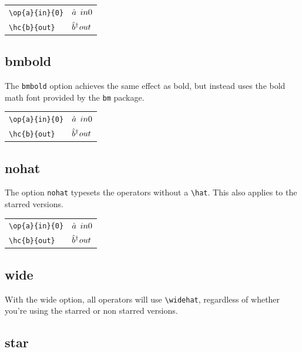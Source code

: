 \documentclass[10pt]{article}
\begin{document}
\renewcommand{\linopstyle}{\mathbf}
\renewcommand{\linopstylewide}{\linopstyle}

\begin{table}[H]
	\centering
	\begin{tabular}{ll}
		\verb|\op{a}{in}{0}| & $\op{a}{in}{0}$ \\
		\verb|\hc{b}{out}| & $\hc{b}{out}$
	\end{tabular}
\end{table}

\subsection{bmbold}
The \texttt{bmbold} option achieves the same effect as bold, but instead uses the bold math font provided by the \texttt{bm} package.

\renewcommand{\linopstyle}{\bm}

\begin{table}[H]
	\centering
	\begin{tabular}{ll}
		\verb|\op{a}{in}{0}| & $\op{a}{in}{0}$ \\
		\verb|\hc{b}{out}| & $\hc{b}{out}$
	\end{tabular}
\end{table}

\subsection{nohat}
The option \texttt{nohat} typesets the operators without a \verb|\hat|. This also applies to the starred versions.

\renewcommand{\linopstyle}{}

\begin{table}[H]
	\centering
	\begin{tabular}{ll}
		\verb|\op{a}{in}{0}| & $\op{a}{in}{0}$ \\
		\verb|\hc{b}{out}| & $\hc{b}{out}$ 
	\end{tabular}
\end{table}

\subsection{wide}

\renewcommand{\linopstyle}{\hat}
With the wide option, all operators will use \verb|\widehat|, regardless of whether you're using the starred or non starred versions.

\subsection{star}
\end{document}
